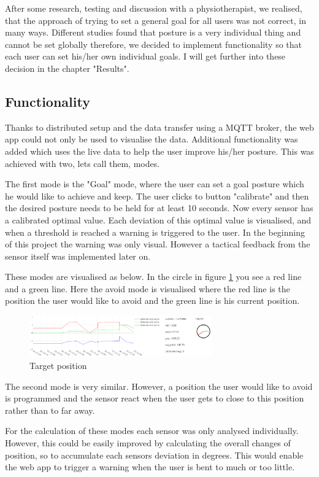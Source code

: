 After some research, testing and discussion with a physiotherapist, we realised, that the approach of trying to set a general goal for all users was not correct, in many ways. Different studies found that posture is a very individual thing and cannot be set globally \cite{SitUpSt77:online} therefore, we decided to implement functionality so that each user can set his/her own individual goals. I will get further into these decision in the chapter "Results".

\subsection{Functionality}

Thanks to distributed setup and the data transfer using a MQTT broker, the web app could not only be used to visualise the data. Additional functionality was added which uses the live data to help the user improve his/her posture. This was achieved with two, lets call them, modes. 

The first mode is the "Goal" mode, where the user can set a goal posture which he would like to achieve and keep. The user clicks to button "calibrate" and then the desired posture needs to be held for at least 10 seconds. 
Now every sensor has a calibrated optimal value. Each deviation of this optimal value is visualised, and when a threshold is reached a warning is triggered to the user. In the beginning of this project the warning was only visual. However a tactical feedback from the sensor itself was implemented later on.

These modes are visualised as below. In the circle in figure \ref{fig:TargetPosition} you see a red line and a green line. Here the avoid mode is visualised where the red line is the position the user would like to avoid and the green line is his current position.

\begin{figure}[ht]
  \begin{center}
\includegraphics[width=0.7\textwidth]{images/WebAppCircle.png}
  \end{center}
  \caption{Target position}
  \label{fig:TargetPosition}
\end{figure}

The second mode is very similar. However, a position the user would like to avoid is programmed and the sensor react when the user gets to close to this position rather than to far away. 

For the calculation of these modes each sensor was only analysed individually. However, this could be easily improved by calculating the overall changes of position, so to accumulate each sensors deviation in degrees. This would enable the web app to trigger a warning when the user is bent to much or too little.